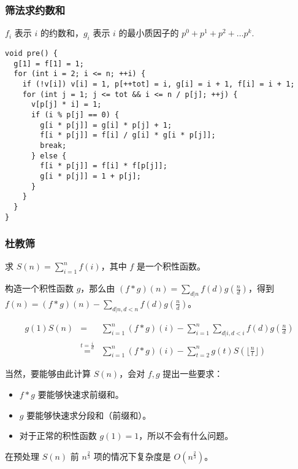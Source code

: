 \documentclass[]{article}
\providecommand{\tightlist}{%
  \setlength{\itemsep}{0pt}\setlength{\parskip}{0pt}}
\begin{document}
\hypertarget{ux7b5bux6cd5ux6c42ux7ea6ux6570ux548c}{%
\subsubsection{筛法求约数和}\label{ux7b5bux6cd5ux6c42ux7ea6ux6570ux548c}}

\(f_i\) 表示 \(i\) 的约数和，\(g_i\) 表示 \(i\) 的最小质因子的
\(p^0+p^1+p^2+\dots p^k\).

\begin{verbatim}
void pre() {
  g[1] = f[1] = 1;
  for (int i = 2; i <= n; ++i) {
    if (!v[i]) v[i] = 1, p[++tot] = i, g[i] = i + 1, f[i] = i + 1;
    for (int j = 1; j <= tot && i <= n / p[j]; ++j) {
      v[p[j] * i] = 1;
      if (i % p[j] == 0) {
        g[i * p[j]] = g[i] * p[j] + 1;
        f[i * p[j]] = f[i] / g[i] * g[i * p[j]];
        break;
      } else {
        f[i * p[j]] = f[i] * f[p[j]];
        g[i * p[j]] = 1 + p[j];
      }
    }
  }
}
\end{verbatim}

\hypertarget{ux675cux6559ux7b5b}{%
\subsubsection{杜教筛}\label{ux675cux6559ux7b5b}}

求 \(S(n)=\sum_{i=1}^n f(i)\)，其中 \(f\) 是一个积性函数。

构造一个积性函数 \(g\)，那么由
\((f*g)(n)=\sum_{d|n}f(d)g(\frac{n}{d})\)，得到
\(f(n)=(f*g)(n)-\sum_{d|n,d<n}f(d)g(\frac{n}{d})\)。

\begin{eqnarray}
g(1)S(n)&=&\sum_{i=1}^n (f*g)(i)-\sum_{i= 1}^{n}\sum_{d|i,d<i}f(d)g(\frac{n}{d}) \\
&\overset{t=\frac{i}{d}}{=}& \sum_{i=1}^n (f*g)(i)-\sum_{t=2}^{n} g(t) S(\lfloor \frac{n}{t} \rfloor)
\end{eqnarray}

当然，要能够由此计算 \(S(n)\)，会对 \(f,g\) 提出一些要求：

\begin{itemize}
\tightlist
\item
  \(f*g\) 要能够快速求前缀和。
\item
  \(g\) 要能够快速求分段和（前缀和）。
\item
  对于正常的积性函数 \(g(1)=1\)，所以不会有什么问题。
\end{itemize}

在预处理 \(S(n)\) 前 \(n^{\frac{2}{3}}\) 项的情况下复杂度是
\(O(n^{\frac{2}{3}})\)。
\end{document}
